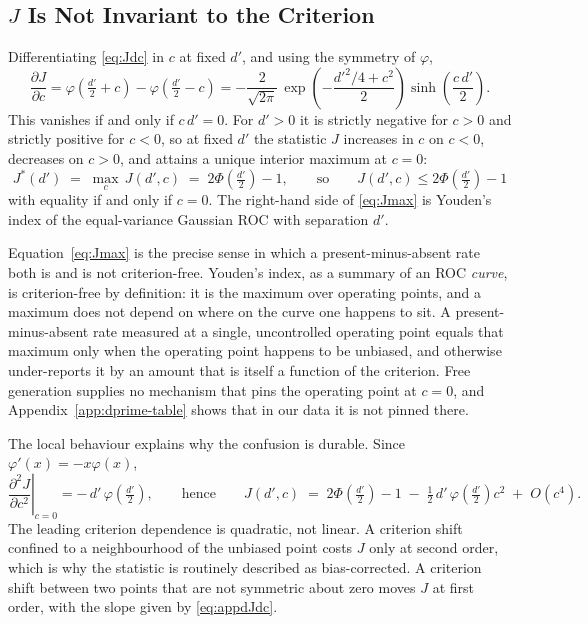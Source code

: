 \subsection{$J$ Is Not Invariant to the Criterion}
\label{app:sdt-noninvariance}

Differentiating \eqref{eq:Jdc} in $c$ at fixed $d'$, and using the symmetry of $\varphi$,
\begin{equation}
\frac{\partial J}{\partial c}
 = \varphi\!\left(\tfrac{d'}{2} + c\right) - \varphi\!\left(\tfrac{d'}{2} - c\right)
 = -\frac{2}{\sqrt{2\pi}}\,
   \exp\!\left(-\frac{d'^2/4 + c^2}{2}\right) \sinh\!\left(\frac{c\,d'}{2}\right).
\label{eq:appdJdc}
\end{equation}
This vanishes if and only if $c\,d' = 0$. For $d' > 0$ it is strictly negative for $c > 0$ and
strictly positive for $c < 0$, so at fixed $d'$ the statistic $J$ increases in $c$ on $c < 0$,
decreases on $c > 0$, and attains a unique interior maximum at $c = 0$:
\begin{equation}
J^{*}(d') \;=\; \max_{c}\, J(d',c) \;=\; 2\Phi\!\left(\tfrac{d'}{2}\right) - 1,
\qquad\text{so}\qquad
J(d',c) \le 2\Phi\!\left(\tfrac{d'}{2}\right) - 1
\label{eq:Jmax}
\end{equation}
with equality if and only if $c = 0$. The right-hand side of \eqref{eq:Jmax} is Youden's index of the
equal-variance Gaussian ROC with separation $d'$.

Equation~\ref{eq:Jmax} is the precise sense in which a present-minus-absent rate both is and is not
criterion-free. Youden's index, as a summary of an ROC \emph{curve}, is criterion-free by
definition: it is the maximum over operating points, and a maximum does not depend on where on the
curve one happens to sit. A present-minus-absent rate measured at a single, uncontrolled operating
point equals that maximum only when the operating point happens to be unbiased, and otherwise
under-reports it by an amount that is itself a function of the criterion. Free generation supplies no
mechanism that pins the operating point at $c = 0$, and Appendix~\ref{app:dprime-table} shows that in
our data it is not pinned there.

The local behaviour explains why the confusion is durable. Since $\varphi'(x) = -x\varphi(x)$,
\begin{equation}
\left.\frac{\partial^2 J}{\partial c^2}\right|_{c=0} = -\,d'\,\varphi\!\left(\tfrac{d'}{2}\right),
\qquad\text{hence}\qquad
J(d',c) \;=\; 2\Phi\!\left(\tfrac{d'}{2}\right) - 1
 \;-\; \tfrac{1}{2}\, d'\, \varphi\!\left(\tfrac{d'}{2}\right) c^{2} \;+\; O(c^{4}).
\label{eq:expand}
\end{equation}
The leading criterion dependence is quadratic, not linear. A criterion shift confined to a
neighbourhood of the unbiased point costs $J$ only at second order, which is why the statistic is
routinely described as bias-corrected. A criterion shift between two points that are not symmetric
about zero moves $J$ at first order, with the slope given by \eqref{eq:appdJdc}.

